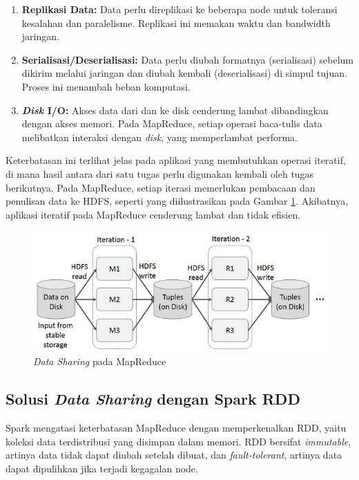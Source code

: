 \begin{enumerate}
    \item \textbf{Replikasi Data:} Data perlu direplikasi ke beberapa node untuk toleransi kesalahan dan paralelisme. Replikasi ini memakan waktu dan bandwidth jaringan.
    \item \textbf{Serialisasi/Deserialisasi:} Data perlu diubah formatnya (serialisasi) sebelum dikirim melalui jaringan dan diubah kembali (deserialisasi) di simpul tujuan. Proses ini menambah beban komputasi.
    \item \textbf{\textit{Disk} I/O:} Akses data dari dan ke disk cenderung lambat dibandingkan dengan akses memori. Pada MapReduce, setiap operasi baca-tulis data melibatkan interaksi dengan \textit{disk}, yang memperlambat performa.
\end{enumerate}

Keterbatasan ini terlihat jelas pada aplikasi yang membutuhkan operasi iteratif, di mana hasil antara dari satu tugas perlu digunakan kembali oleh tugas berikutnya. Pada MapReduce, setiap iterasi memerlukan pembacaan dan penulisan data ke HDFS, seperti yang diilustrasikan pada Gambar \ref{fig:iterative_operations_on_mapreduce}. Akibatnya, aplikasi iteratif pada MapReduce cenderung lambat dan tidak efisien.

\begin{figure}[h]
    \centering
    \includegraphics[width=1\textwidth]{figures/ch02/iterative_operations_on_mapreduce}
    \caption{\textit{Data Sharing} pada MapReduce \cite{ApacheSparkRDD}}
    \label{fig:iterative_operations_on_mapreduce}
\end{figure}

\subsection{Solusi \textit{Data Sharing} dengan Spark RDD}

Spark mengatasi keterbatasan MapReduce dengan memperkenalkan RDD, yaitu koleksi data terdistribusi yang disimpan dalam memori. RDD bersifat \textit{immutable}, artinya data tidak dapat diubah setelah dibuat, dan \textit{fault-tolerant}, artinya data dapat dipulihkan jika terjadi kegagalan node.

